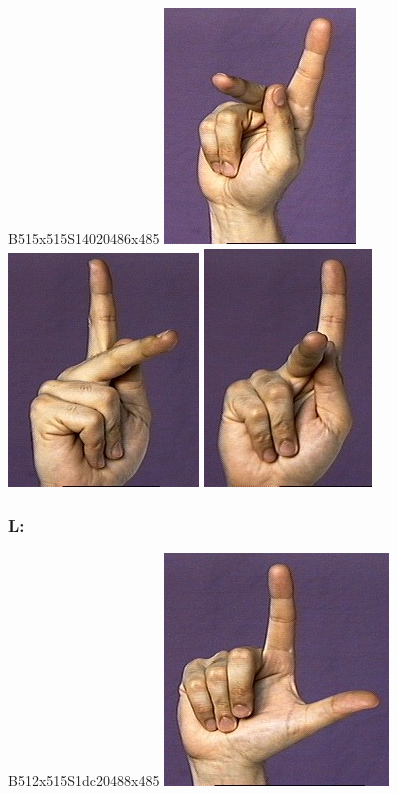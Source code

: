 \documentclass{article}
\begin{document}
B515x515S14020486x485
\includegraphics[scale=0.5]{images/k.jpg}
\includegraphics[scale=0.5]{images/k1.jpg}
\includegraphics[scale=0.5]{images/k2.jpg}

\subsubsection{L:}

B512x515S1dc20488x485
\includegraphics[scale=0.5]{images/l.jpg}
\end{document}
